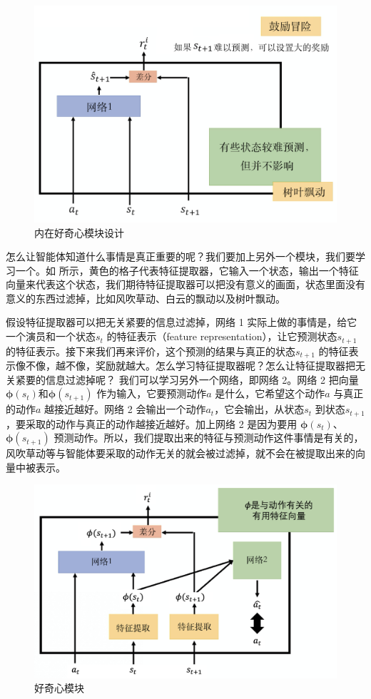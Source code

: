 \begin{figure}[htb]
    \centering
    \includegraphics[width=0.5\linewidth]{res/ch10/10.4}
    \caption{内在好奇心模块设计}
    \label{fig:fig10.4}
\end{figure}


怎么让智能体知道什么事情是真正重要的呢？我们要加上另外一个模块，我们要学习一个。如 所示，黄色的格子代表特征提取器，它输入一个状态，输出一个特征向量来代表这个状态，我们期待特征提取器可以把没有意义的画面，状态里面没有意义的东西过滤掉，比如风吹草动、白云的飘动以及树叶飘动。

假设特征提取器可以把无关紧要的信息过滤掉，网络 1 实际上做的事情是，给它一个演员和一个状态$s_t$ 的特征表示（feature representation），让它预测状态$s_{t+1}$ 的特征表示。接下来我们再来评价，这个预测的结果与真正的状态$s_{t+1}$ 的特征表示像不像，越不像，奖励就越大。怎么学习特征提取器呢？怎么让特征提取器把无关紧要的信息过滤掉呢？
我们可以学习另外一个网络，即网络 2。网络 2 把向量 $\pmb{\phi}(s_t)$和$\pmb{\phi}(s_{t+1})$ 作为输入，它要预测动作$a$ 是什么，它希望这个动作$a$ 与真正的动作$a$ 越接近越好。网络 2 会输出一个动作$a_t$，它会输出，从状态$s_t$ 到状态$s_{t+1}$，要采取的动作与真正的动作越接近越好。加上网络 2 是因为要用 $\pmb{\phi}(s_t)$、$\pmb{\phi}(s_{t+1})$  预测动作。所以，我们提取出来的特征与预测动作这件事情是有关的，风吹草动等与智能体要采取的动作无关的就会被过滤掉，就不会在被提取出来的向量中被表示。

\begin{figure}[htb]
    \centering
    \includegraphics[width=0.5\linewidth]{res/ch10/10.5}
    \caption{好奇心模块}
    \label{fig:fig10.5}
\end{figure}

